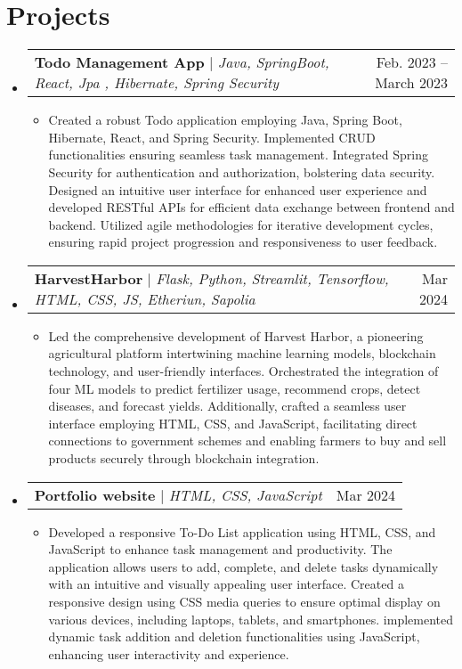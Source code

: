 \documentclass[letterpaper,11pt]{article}
\makeatletter
\newcommand{\resumeItem}[1]{
  \item\small{
    {#1 \vspace{-2pt}}
  }
}
\newcommand{\resumeSubSubheading}[2]{
    \item
    \begin{tabular*}{0.97\textwidth}{l@{\extracolsep{\fill}}r}
      \textit{\small#1} & \textit{\small #2} \\
    \end{tabular*}\vspace{-7pt}
}
\newcommand{\resumeProjectHeading}[2]{
    \item
    \begin{tabular*}{0.97\textwidth}{l@{\extracolsep{\fill}}r}
      \small#1 & #2 \\
    \end{tabular*}\vspace{-7pt}
}
\newcommand{\resumeSubHeadingListStart}{\begin{itemize}[leftmargin=0.15in, label={}]}
\newcommand{\resumeSubHeadingListEnd}{\end{itemize}}
\newcommand{\resumeItemListStart}{\begin{itemize}}
\newcommand{\resumeItemListEnd}{\end{itemize}\vspace{-5pt}}
\makeatother
\begin{document}

    
\section{Projects}
    \resumeSubHeadingListStart
      \resumeProjectHeading
          {\textbf{Todo Management App} $|$ \emph{Java, SpringBoot, React, Jpa , Hibernate, Spring Security}}{Feb. 2023 -- March 2023 }
          \resumeItemListStart
            \resumeItem{Created a robust Todo application employing Java, Spring Boot, Hibernate, React, and Spring Security. Implemented CRUD functionalities ensuring seamless task management. Integrated Spring Security for authentication and authorization, bolstering data security. Designed an intuitive user interface for enhanced user experience and developed RESTful APIs for efficient data exchange between frontend and backend. Utilized agile methodologies for iterative development cycles, ensuring rapid project progression and responsiveness to user feedback.}
           \resumeItemListEnd
      \resumeProjectHeading
          {\textbf{HarvestHarbor} $|$ \emph{Flask, Python, Streamlit, Tensorflow, HTML, CSS, JS, Etheriun, Sapolia}}{Mar 2024}
          \resumeItemListStart
            \resumeItem{Led the comprehensive development of Harvest Harbor, a pioneering agricultural platform intertwining machine learning models, blockchain technology, and user-friendly interfaces. Orchestrated the integration of four ML models to predict fertilizer usage, recommend crops, detect diseases, and forecast yields. Additionally, crafted a seamless user interface employing HTML, CSS, and JavaScript, facilitating direct connections to government schemes and enabling farmers to buy and sell products securely through blockchain integration.}
          \resumeItemListEnd
          \resumeProjectHeading
          {\textbf{Portfolio website} $|$ \emph{HTML, CSS, JavaScript}}{Mar 2024}
          \resumeItemListStart
            \resumeItem{Developed a responsive To-Do List application using HTML, CSS, and JavaScript to enhance task management and productivity. The application allows users to add, complete, and delete tasks dynamically with an intuitive and visually appealing user interface. Created a responsive design using CSS media queries to ensure optimal display on various devices, including laptops, tablets, and smartphones. implemented dynamic task addition and deletion functionalities using JavaScript, enhancing user interactivity and experience.  }
          \resumeItemListEnd
    \resumeSubHeadingListEnd
\end{document}
